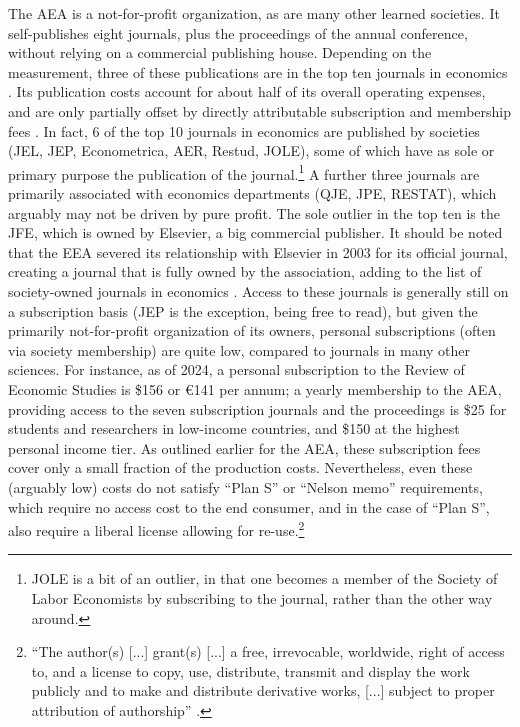 \documentclass{Revue-economique}
\newcommand{\citep}{\parencite}
\begin{document}
\begin{Article} [%
	Titre={Reproducibility and Open Science in Economics},
	Auteur={Lars Vilhuber\thanks{Cornell University, lars.vilhuber@cornell.edu}}]
\begin{refsection}[Main]
The \ac{AEA} is a not-for-profit organization, as are many other learned societies. It self-publishes eight journals, plus the proceedings of the annual conference, without relying on a commercial publishing house. Depending on the measurement, three of these publications are in the top ten journals in economics \citep{mogstad_statistical_2022-1}. Its publication costs account for about half of its overall operating expenses, and are only partially offset by directly attributable subscription and membership fees \citep{cherry_bekaert_llp_american_2024}. In fact, 6 of the top 10 journals in economics \citep{mogstad_statistical_2022-1} are published by societies (JEL, JEP, Econometrica, AER, Restud, JOLE), some of which have as sole or primary purpose the publication of the journal.\footnote{JOLE is a bit of an outlier, in that one becomes a member of the Society of Labor Economists by subscribing to the journal, rather than the other way around.} A further three journals are primarily associated with economics departments (QJE, JPE, RESTAT), which arguably may not be driven by pure profit. The sole outlier in the top ten is the \ac{JFE}, which is owned by Elsevier, a big commercial publisher. It should be noted that the \ac{EEA} severed its relationship with Elsevier in 2003 for its official journal, creating a journal that is fully owned by the association, adding to the list of society-owned journals in economics \citep{tirole_editorial_2003}. Access to these journals is generally still on a subscription basis (JEP is the exception, being free to read), but given the primarily not-for-profit organization of its owners, personal subscriptions (often via society membership) are quite low, compared to journals in many other sciences. For instance, as of 2024, a personal subscription to the Review of Economic Studies is \$156 or €141 per annum; a yearly membership to the \ac{AEA}, providing access to the seven subscription journals and the proceedings is \$25 for students and researchers in low-income countries, and \$150 at the highest personal income tier. As outlined earlier for the AEA, these subscription fees cover only a small fraction of the production costs. Nevertheless, even these (arguably low) costs do not satisfy ``Plan S'' or ``Nelson memo'' requirements, which require no access cost to the end consumer, and in the case of ``Plan S'', also require a liberal license allowing for re-use.\footnote{``The author(s) [...] grant(s) [...] a free, irrevocable, worldwide, right of access to, and a license to copy, use, distribute, transmit and display the work publicly and to make and distribute derivative works, [...] subject to proper attribution of authorship'' \citep{max-planck-gesellschaft_berlin_2023}. }


\end{refsection}
\end{Article}
\end{document}
